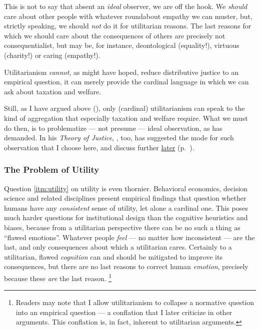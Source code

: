 This is not to say that absent an \emph{ideal} observer, we are off the hook.
We \emph{should} care about other people with whatever roundabout empathy we can muster, but, strictly speaking, we should \emph{not} do it for utilitarian reasons.
The last reasons for which we should care about the consequences of others are precisely not consequentialist, but may be, for instance, deontological (equality!), virtuous (charity!) or caring (empathy!).

Utilitarianism \emph{cannot}, as \cite{Bentham1789} might have hoped, reduce distributive justice to an empirical question, it can merely provide the cardinal language in which we can ask about taxation and welfare.

Still, as I have argued above (), only (cardinal) utilitarianism can speak to the kind of aggregation that especially taxation and welfare require.%
What we must do then, is to problematize --- not presume --- ideal observation, as \citealt{Rawls1988} has demanded.
In his \emph{Theory of Justice}, \citeauthor{Rawls-1971}, too, has suggested the mode for such observation that I choose here, and discuss further \hyperref[sec:fair]{later} (p.~\pageref{sec:fair}).

\subsubsection[Utility]{The Problem of Utility}
	\label{sec:utility}

Question \ref{itm:utility} on utility is even thornier.
Behavioral economics, decision science and related disciplines present empirical findings that question whether humans have any \emph{consistent} sense of utility, let alone a cardinal one.
This poses much harder questions for institutional design than the cognitive heuristics and biases, because from a utilitarian perspective there can be no such a thing as ``flawed emotions''.
Whatever people \emph{feel} --- no matter how inconsistent --- are the last, and only consequences about which a utilitarian cares.
Certainly to a utilitarian, flawed \emph{cognition} can and should be mitigated to improve its consequences, but there are no last reasons to correct human \emph{emotion}, precisely because these \emph{are} the last reason.
\footnote{
	Readers may note that I allow utilitarianism to collapse a normative question into an empirical question --- a conflation that I later criticize in other arguments.
	This conflation is, in fact, inherent to utilitarian arguments.
}

